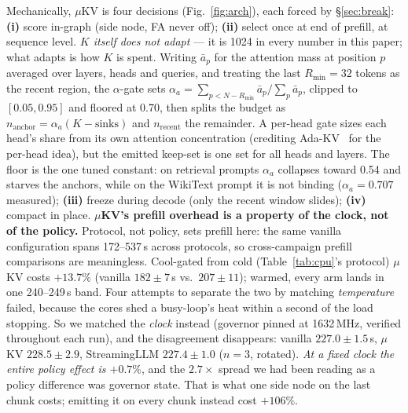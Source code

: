 \documentclass[sigconf,10pt]{acmart}
\begin{document}
Mechanically, $\mu$KV is four decisions (Fig.~\ref{fig:arch}), each forced by \S\ref{sec:break}: \textbf{(i)} score in-graph (side node, FA never off); \textbf{(ii)} select once at end of prefill, at sequence level. \emph{$K$ itself does not adapt} --- it is 1024 in every number in this paper; what adapts is how $K$ is spent. Writing $\bar a_p$ for the attention mass at position $p$ averaged over layers, heads and queries, and treating the last $R_{\min}{=}32$ tokens as the recent region, the $\alpha$-gate sets $\alpha_a=\sum_{p<N-R_{\min}}\bar a_p / \sum_p \bar a_p$, clipped to $[0.05,0.95]$ and floored at 0.70, then splits the budget as $n_{\text{anchor}}{=}\alpha_a(K{-}\text{sinks})$ and $n_{\text{recent}}$ the remainder. A per-head gate sizes each head's share from its own attention concentration (crediting Ada-KV~\cite{adakv} for the per-head idea), but the emitted keep-set is one set for all heads and layers. The floor is the one tuned constant: on retrieval prompts $\alpha_a$ collapses toward 0.54 and starves the anchors, while on the WikiText prompt it is not binding ($\alpha_a{=}0.707$ measured); \textbf{(iii)} freeze during decode (only the recent window slides); \textbf{(iv)} compact in place. \textbf{$\mu$KV's prefill overhead is a property of the clock, not of the policy.} Protocol, not policy, sets prefill here: the same vanilla configuration spans 172--537\,s across protocols, so cross-campaign prefill comparisons are meaningless. Cool-gated from cold (Table~\ref{tab:cpu}'s protocol) $\mu$KV costs $+13.7\%$ (vanilla $182{\pm}7$\,s vs.\ $207{\pm}11$); warmed, every arm lands in one 240--249\,s band. Four attempts to separate the two by matching \emph{temperature} failed, because the cores shed a busy-loop's heat within a second of the load stopping. So we matched the \emph{clock} instead (governor pinned at 1632\,MHz, verified throughout each run), and the disagreement disappears: vanilla $227.0{\pm}1.5$\,s, $\mu$KV $228.5{\pm}2.9$, StreamingLLM $227.4{\pm}1.0$ ($n{=}3$, rotated). \emph{At a fixed clock the entire policy effect is $+0.7\%$}, and the $2.7\times$ spread we had been reading as a policy difference was governor state. That is what one side node on the last chunk costs; emitting it on every chunk instead cost $+106\%$.
\end{document}
